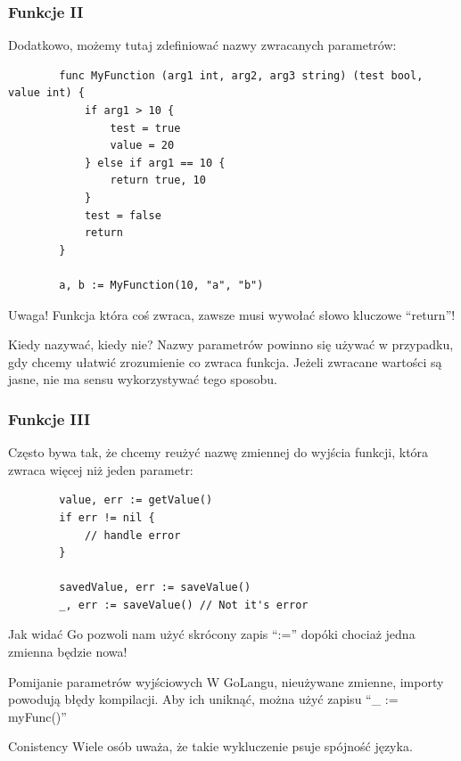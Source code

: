 \documentclass[10pt]{beamer}
\newcommand{\quotes}[1]{``#1''}
\begin{document}
\begin{frame}[fragile]
    \frametitle{Funkcje II}
    Dodatkowo, możemy tutaj zdefiniować nazwy zwracanych parametrów:

    \begin{verbatim}
        func MyFunction (arg1 int, arg2, arg3 string) (test bool, value int) {
            if arg1 > 10 {
                test = true
                value = 20
            } else if arg1 == 10 {
                return true, 10
            }
            test = false
            return
        }
        
        a, b := MyFunction(10, "a", "b")
    \end{verbatim}

    \begin{alertblock}{Uwaga!}
        Funkcja która coś zwraca, zawsze musi wywołać słowo kluczowe \quotes{return}!
    \end{alertblock}

    \begin{block}{Kiedy nazywać, kiedy nie?}
        Nazwy parametrów powinno się używać w przypadku, gdy chcemy ułatwić
        zrozumienie co zwraca funkcja. Jeżeli zwracane wartości są jasne,
        nie ma sensu wykorzystywać tego sposobu.
    \end{block}
\end{frame}

\begin{frame}[fragile]
    \frametitle{Funkcje III}
    Często bywa tak, że chcemy reużyć nazwę zmiennej do wyjścia funkcji,
    która zwraca więcej niż jeden parametr:

    \begin{verbatim}
        value, err := getValue()
        if err != nil {
            // handle error
        }

        savedValue, err := saveValue()
        _, err := saveValue() // Not it's error
    \end{verbatim}

    Jak widać Go pozwoli nam użyć skrócony zapis \quotes{:=} dopóki chociaż
    jedna zmienna będzie nowa!

    \begin{block}{Pomijanie parametrów wyjściowych}
        W GoLangu, nieużywane zmienne, importy powodują błędy kompilacji.
        Aby ich uniknąć, można użyć zapisu \quotes{\_ := myFunc()}
    \end{block}

    \begin{block}{Conistency}
        Wiele osób uważa, że takie wykluczenie psuje spójność języka.
    \end{block}
\end{frame}
\end{document}
